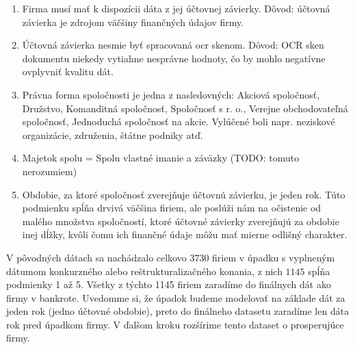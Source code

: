 \begin{enumerate}
    \item Firma musí mať k dispozícii dáta z jej účtovnej závierky. Dôvod: účtovná závierka je zdrojom väčšiny finančných údajov firmy.
    \item Účtovná závierka nesmie byť spracovaná ocr skenom. Dôvod: OCR sken dokumentu niekedy vytiahne nesprávne hodnoty, čo by mohlo negatívne ovplyvniť kvalitu dát.
    \item Právna forma spoločnosti je jedna z nasledovných: Akciová spoločnosť, Družstvo, Komanditná spoločnosť, Spoločnosť s r. o., Verejne obchodovateľná spoločnosť, Jednoduchá spoločnosť na akcie. Vylúčené boli napr. neziskové organizácie, združenia, štátne podniky atď.
    \item Majetok spolu = Spolu vlastné imanie a záväzky (TODO: tomuto nerozumiem)
    \item Obdobie, za ktoré spoločnosť zverejňuje účtovnú závierku, je jeden rok. Túto podmienku spĺňa drvivá väčšina firiem, ale poslúži nám na očistenie od malého množstva spoločností, ktoré účtovné závierky zverejňujú za obdobie inej dĺžky, kvôli čomu ich finančné údaje môžu mať mierne odlišný charakter.
\end{enumerate}

V pôvodných dátach sa nachádzalo celkovo \(3730\) firiem v úpadku s vyplneným dátumom konkurzného alebo reštrukturalizačného konania, z nich \(1145\) spĺňa podmienky 1 až 5.
Všetky z týchto 1145 firiem zaradíme do finálnych dát ako firmy v bankrote.
Uvedomme si, že úpadok budeme modelovať na základe dát za jeden rok (jedno účtovné obdobie), preto do finálneho datasetu zaradíme len dáta rok pred úpadkom firmy.
V ďalšom kroku rozšírime tento dataset o prosperujúce firmy.

